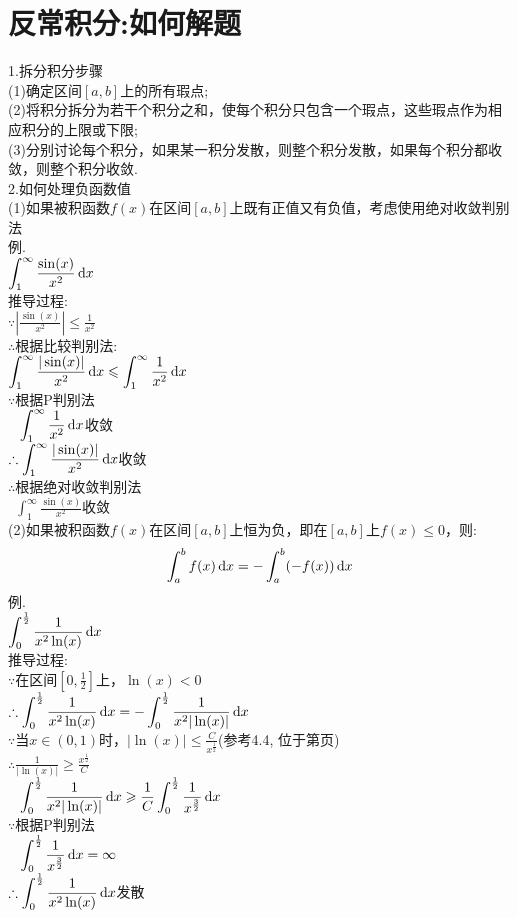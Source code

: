 \chapter{反常积分:如何解题}
1.拆分积分步骤\\
(1)确定区间$[a,b]$上的所有瑕点;\\
(2)将积分拆分为若干个积分之和，使每个积分只包含一个瑕点，这些瑕点作为相应积分的上限或下限;\\
(3)分别讨论每个积分，如果某一积分发散，则整个积分发散，如果每个积分都收敛，则整个积分收敛.\\[2ex]

2.如何处理负函数值\\
(1)如果被积函数$f(x)$在区间$[a,b]$上既有正值又有负值，考虑使用绝对收敛判别法\\
例.\\
$\displaystyle\int_1^{\infty}\frac{\sin(x)}{x^2}\mathop{}\!\mathrm{d} x$\\
推导过程:\\
$\displaystyle\because|\frac{\sin(x)}{x^2}|\leqslant\frac{1}{x^2}$\\
$\therefore$根据比较判别法:\\
$\displaystyle\int_1^{\infty}\frac{|\sin(x)|}{x^2}\mathop{}\!\mathrm{d} x\leqslant\int_1^{\infty}\frac{1}{x^2}\mathop{}\!\mathrm{d} x$\\
$\because$根据P判别法\\
$\displaystyle\phantom{\because}\int_1^{\infty}\frac{1}{x^2}\mathop{}\!\mathrm{d} x$收敛\\[1ex]
$\displaystyle\therefore\int_1^{\infty}\frac{|\sin(x)|}{x^2}\mathop{}\!\mathrm{d} x$收敛\\
$\therefore$根据绝对收敛判别法\\
$\displaystyle\phantom{\therefore}\int_1^{\infty}\frac{\sin(x)}{x^2}$收敛\\[2ex]

(2)如果被积函数$f(x)$在区间$[a,b]$上恒为负，即在$[a,b]$上$f(x)\leqslant 0$，则:
\[\int_a^bf(x)\mathop{}\!\mathrm{d} x=-\int_a^b(-f(x))\mathop{}\!\mathrm{d} x\]
例.\\
$\displaystyle\int_0^{\frac{1}{2}}\frac{1}{x^2\ln(x)}\mathop{}\!\mathrm{d} x$\\
推导过程:\\
$\because$在区间$[0,\frac{1}{2}]$上，$\ln(x)<0$\\
$\displaystyle\therefore\int_0^{\frac{1}{2}}\frac{1}{x^2\ln(x)}\mathop{}\!\mathrm{d} x=-\int_0^{\frac{1}{2}}\frac{1}{x^2|\ln(x)|}\mathop{}\!\mathrm{d} x$\\
$\because$当$x\in(0,1)$时，$\displaystyle|\ln(x)|\leqslant\frac{C}{x^{\frac{1}{2}}}$(参考4.4, 位于第\pageref{integral:num_01}页)\\
$\displaystyle\therefore\frac{1}{|\ln(x)|}\geqslant\frac{x^{\frac{1}{2}}}{C}$\\
$\displaystyle\phantom{\therefore}\int_0^{\frac{1}{2}}\frac{1}{x^2|\ln(x)|}\mathop{}\!\mathrm{d} x\geqslant\frac{1}{C}\int_0^{\frac{1}{2}}\frac{1}{x^{\frac{3}{2}}}\mathop{}\!\mathrm{d} x$\\
$\because$根据P判别法\\
$\displaystyle\phantom{\because}\int_0^{\frac{1}{2}}\frac{1}{x^{\frac{3}{2}}}\mathop{}\!\mathrm{d} x=\infty$\\
$\displaystyle\therefore\int_0^{\frac{1}{2}}\frac{1}{x^2\ln(x)}\mathop{}\!\mathrm{d} x$发散\\[2ex]

